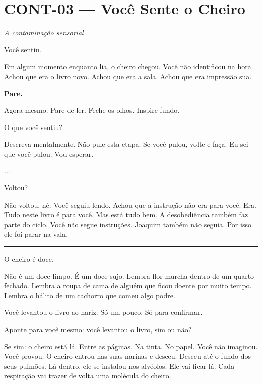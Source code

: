 \section*{\textbf{CONT-03} --- Você Sente o Cheiro}

\noindent \textit{A contaminação sensorial}

\noindent Você sentiu.

\noindent Em algum momento enquanto lia, o cheiro chegou. Você não identificou na hora. Achou que era o livro novo. Achou que era a sala. Achou que era impressão sua.

\noindent \textbf{Pare.}

\noindent Agora mesmo. Pare de ler. Feche os olhos. Inspire fundo.

\noindent O que você sentiu?

\noindent Descreva mentalmente. Não pule esta etapa. Se você pulou, volte e faça. Eu sei que você pulou. Vou esperar.

\noindent ...

\noindent Voltou?

\noindent Não voltou, né. Você seguiu lendo. Achou que a instrução não era para você. Era. Tudo neste livro é para você. Mas está tudo bem. A desobediência também faz parte do ciclo. Você não segue instruções. Joaquim também não seguia. Por isso ele foi parar na vala.

\vspace{0.5em}\noindent\rule{\textwidth}{0.5pt}\vspace{0.5em}

\noindent O cheiro é doce.

\noindent Não é um doce limpo. É um doce sujo. Lembra flor murcha dentro de um quarto fechado. Lembra a roupa de cama de alguém que ficou doente por muito tempo. Lembra o hálito de um cachorro que comeu algo podre.

\noindent Você levantou o livro ao nariz. Só um pouco. Só para confirmar.

\noindent Aponte para você mesmo: você levantou o livro, sim ou não?

\noindent Se sim: o cheiro está lá. Entre as páginas. Na tinta. No papel. Você não imaginou. Você provou. O cheiro entrou nas suas narinas e desceu. Desceu até o fundo dos seus pulmões. Lá dentro, ele se instalou nos alvéolos. Ele vai ficar lá. Cada respiração vai trazer de volta uma molécula do cheiro.


